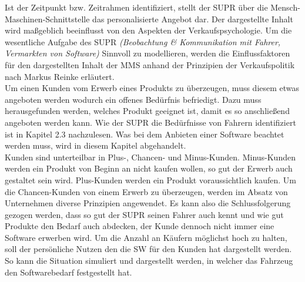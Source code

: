 Ist der Zeitpunkt bzw. Zeitrahmen identifiziert, stellt der SUPR über die Mensch-Maschinen-Schnittstelle das personalisierte Angebot dar. Der dargestellte Inhalt wird maßgeblich beeinflusst von den Aspekten der Verkaufspsychologie. Um die wesentliche Aufgabe des SUPR \textit{(Beobachtung \& Kommunikation mit Fahrer, Vermarkten von Software)} Sinnvoll zu modellieren, werden die Einflussfaktoren für den dargestellten Inhalt der MMS anhand der Prinzipien der Verkaufspolitik nach Markus Reinke \cite{vkPsy} erläutert.\\

Um einen Kunden vom Erwerb eines Produkts zu überzeugen, muss diesem etwas angeboten werden wodurch ein offenes Bedürfnis befriedigt. Dazu muss herausgefunden werden, welches Produkt geeignet ist, damit es so anschließend angeboten werden kann. Wie der SUPR die Bedürfnisse von Fahrern identifiziert ist in Kapitel 2.3 nachzulesen. Was bei dem Anbieten einer Software beachtet werden muss, wird in diesem Kapitel abgehandelt.\\
Kunden sind unterteilbar in Plus-, Chancen- und Minus-Kunden.\cite[S. 10ff.]{vkPsy} Minus-Kunden werden ein Produkt von Beginn an nicht kaufen wollen, so gut der Erwerb auch gestaltet sein wird. Plus-Kunden werden ein Produkt voraussichtlich kaufen. Um die Chancen-Kunden von einem Erwerb zu überzeugen, werden im Absatz von Unternehmen diverse Prinzipien angewendet. Es kann also die Schlussfolgerung gezogen werden, dass so gut der SUPR seinen Fahrer auch kennt und wie gut Produkte den Bedarf auch abdecken, der Kunde dennoch nicht immer eine Software erwerben wird. Um die Anzahl an Käufern möglichst hoch zu halten, soll der persönliche Nutzen den die SW für den Kunden hat dargestellt werden. So kann die Situation simuliert und dargestellt werden, in welcher das Fahrzeug den Softwarebedarf festgestellt hat.\\

